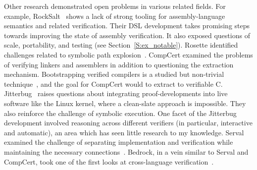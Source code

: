 Other research demonstrated open problems in various related fields. For
example, RockSalt~\cite{Morrisett_2012} shows a lack of strong tooling for
assembly-language semantics and related verification. Their DSL development
takes promising steps towards improving the state of assembly verification. It
also exposed questions of scale, portability, and testing (see
Section~\ref{S:ex_notable}). Rosette identified challenges related to symbolic
path explosion~\cite{Bornholt_2018,Porncharoenwase_2020}. CompCert examined the
problems of verifying linkers and assemblers in addition to questioning the
extraction mechanism. Bootstrapping verified compilers is a studied but
non-trivial technique~\cite{Konat_2016,Myreen_2021}, and the goal for CompCert
would to extract to verifiable C. Jitterbug~\cite{258848} raises questions about
integrating proof-developments into live software like the Linux kernel, where a
clean-slate approach is impossible. They also reinforce the challenge of
symbolic execution. One facet of the Jitterbug development involved reasoning
across different verifiers (in particular, interactive and automatic), an area
which has seen little research to my knowledge. Serval examined the challenge of
separating implementation and verification while maintaining the necessary
connections~\cite{Nelson_2019}. Bedrock, in a vein similar to Serval and
CompCert, took one of the first looks at cross-language
verification~\cite{Wang_2014}.
